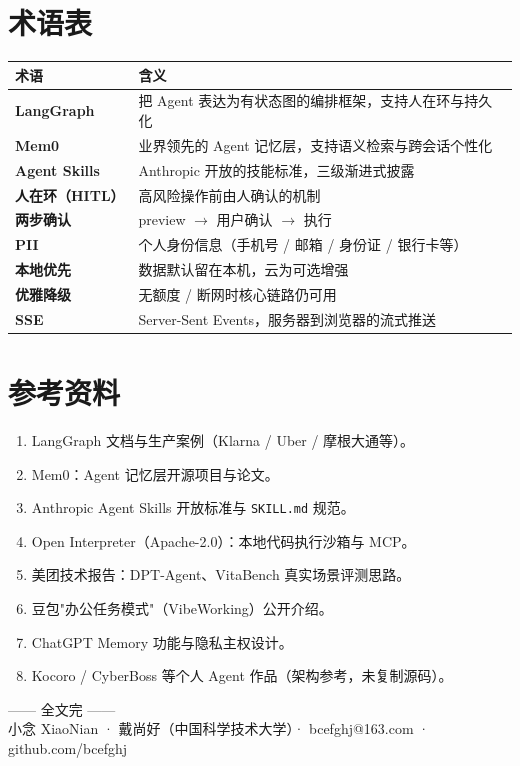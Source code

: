 \chapter{术语表}
{\small
\begin{xltabular}{\linewidth}{>{\bfseries}p{3.4cm} X}
\toprule
术语 & 含义 \\
\midrule
\endhead
LangGraph & 把 Agent 表达为有状态图的编排框架，支持人在环与持久化 \\
Mem0 & 业界领先的 Agent 记忆层，支持语义检索与跨会话个性化 \\
Agent Skills & Anthropic 开放的技能标准，三级渐进式披露 \\
人在环（HITL） & 高风险操作前由人确认的机制 \\
两步确认 & preview $\to$ 用户确认 $\to$ 执行 \\
PII & 个人身份信息（手机号 / 邮箱 / 身份证 / 银行卡等） \\
本地优先 & 数据默认留在本机，云为可选增强 \\
优雅降级 & 无额度 / 断网时核心链路仍可用 \\
SSE & Server-Sent Events，服务器到浏览器的流式推送 \\
\bottomrule
\end{xltabular}}


\chapter{参考资料}
\begin{enumerate}[leftmargin=1.8em]
  \item LangGraph 文档与生产案例（Klarna / Uber / 摩根大通等）。
  \item Mem0：Agent 记忆层开源项目与论文。
  \item Anthropic Agent Skills 开放标准与 \texttt{SKILL.md} 规范。
  \item Open Interpreter（Apache-2.0）：本地代码执行沙箱与 MCP。
  \item 美团技术报告：DPT-Agent、VitaBench 真实场景评测思路。
  \item 豆包"办公任务模式"（VibeWorking）公开介绍。
  \item ChatGPT Memory 功能与隐私主权设计。
  \item Kocoro / CyberBoss 等个人 Agent 作品（架构参考，未复制源码）。
\end{enumerate}

\vspace{1cm}
\begin{center}
\footnotesize\color{linegray}
—— 全文完 ——\\
小念 XiaoNian · 戴尚好（中国科学技术大学）· bcefghj@163.com · github.com/bcefghj
\end{center}
